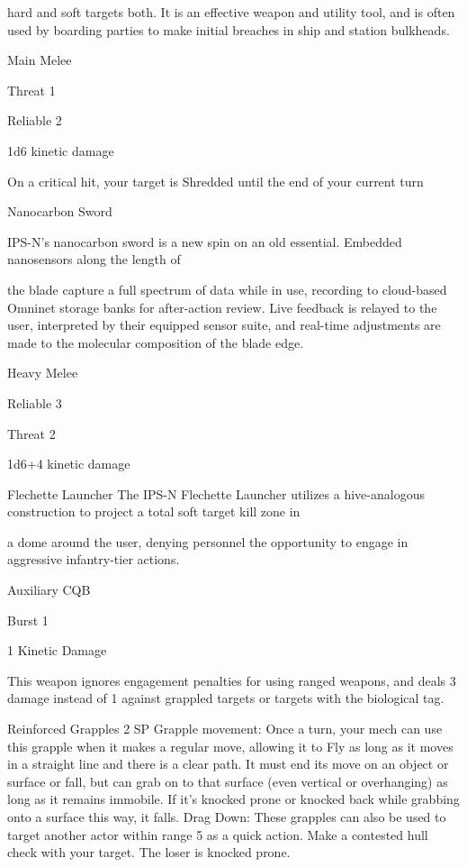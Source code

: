 hard and soft targets both. It is an effective weapon and utility tool, and is often used by boarding parties to
make initial breaches in ship and station bulkheads.

Main Melee

Threat 1

Reliable 2

1d6 kinetic damage

On a critical hit, your target is Shredded until the end of your current turn


Nanocarbon Sword

IPS-N’s nanocarbon sword is a new spin on an old essential. Embedded nanosensors along the length of

the blade capture a full spectrum of data while in use, recording to cloud-based Omninet storage banks for
after-action review. Live feedback is relayed to the user, interpreted by their equipped sensor suite, and
real-time adjustments are made to the molecular composition of the blade edge.

Heavy Melee





Reliable 3

Threat 2

1d6+4 kinetic damage


Flechette Launcher
The IPS-N Flechette Launcher utilizes a hive-analogous construction to project a total soft target kill zone in

a dome around the user, denying personnel the opportunity to engage in aggressive infantry-tier actions.

Auxiliary CQB

Burst 1

1 Kinetic Damage

This weapon ignores engagement penalties for using ranged weapons, and deals 3 damage instead of 1 against grappled targets or targets with the biological tag.


Reinforced Grapples
2 SP
Grapple movement: Once a turn, your mech can use this grapple when it makes a regular move,
allowing it to Fly as long as it moves in a straight line and there is a clear path. It must end its
move on an object or surface or fall, but can grab on to that surface (even vertical or overhanging)
as long as it remains immobile. If it’s knocked prone or knocked back while grabbing onto a
surface this way, it falls.
Drag Down: These grapples can also be used to target another actor within range 5 as a quick
action. Make a contested hull check with your target. The loser is knocked prone.


